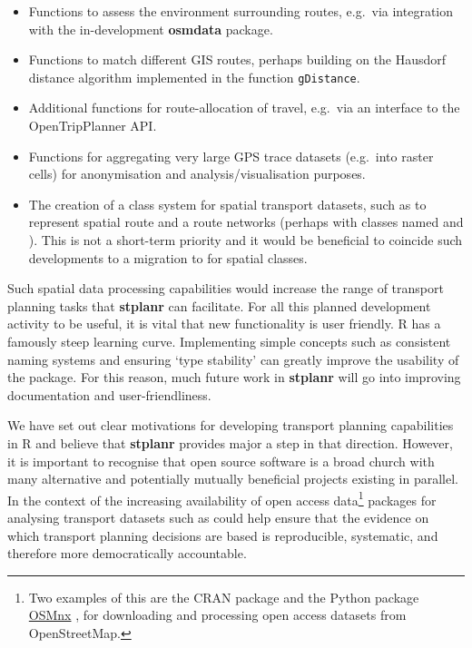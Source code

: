 \begin{itemize}
\tightlist
\item
  Functions to assess the environment surrounding routes, e.g.~via
  integration with the in-development \textbf{osmdata} package.
\item
  Functions to match different GIS routes, perhaps building on the
  Hausdorf distance algorithm implemented in the 
  function \texttt{gDistance}.
\item
  Additional functions for route-allocation of travel, e.g.~via an
  interface to the OpenTripPlanner API.
\item
  Functions for aggregating very large GPS trace datasets (e.g.~into
  raster cells) for anonymisation and analysis/visualisation purposes.
\item
  The creation of a class system for spatial transport datasets, such as
  to represent spatial route and a route networks (perhaps with classes
  named  and ). This is not a short-term priority
  and it would be beneficial to coincide such developments to a
  migration to  for spatial classes.
\end{itemize}

Such spatial data processing capabilities would increase the range of
transport planning tasks that \textbf{stplanr} can facilitate. For all
this planned development activity to be useful, it is vital that new
functionality is user friendly. R has a famously steep learning curve.
Implementing simple concepts such as consistent naming systems
\citep{baath_state_2012} and ensuring `type stability' can greatly
improve the usability of the package. For this reason, much future work
in \textbf{stplanr} will go into improving documentation and
user-friendliness.

We have set out clear motivations for
developing transport planning capabilities in R and believe that
\textbf{stplanr} provides major a step in that direction.
However, it is important to recognise that open source software is
a broad church with many alternative and potentially mutually beneficial
projects existing in parallel.
In the context of the increasing availability of open access data\footnote{Two
examples of this are the  CRAN package \citep{Padgham2017} and the Python package
\href{https://github.com/gboeing/osmnx}{OSMnx} \citep{boeing_osmnx:_2017}, for downloading and processing
open access datasets from OpenStreetMap.}
packages for analysing transport datasets such as  could help
ensure that the
evidence on which transport planning decisions are based is reproducible,
systematic, and therefore more democratically accountable.

